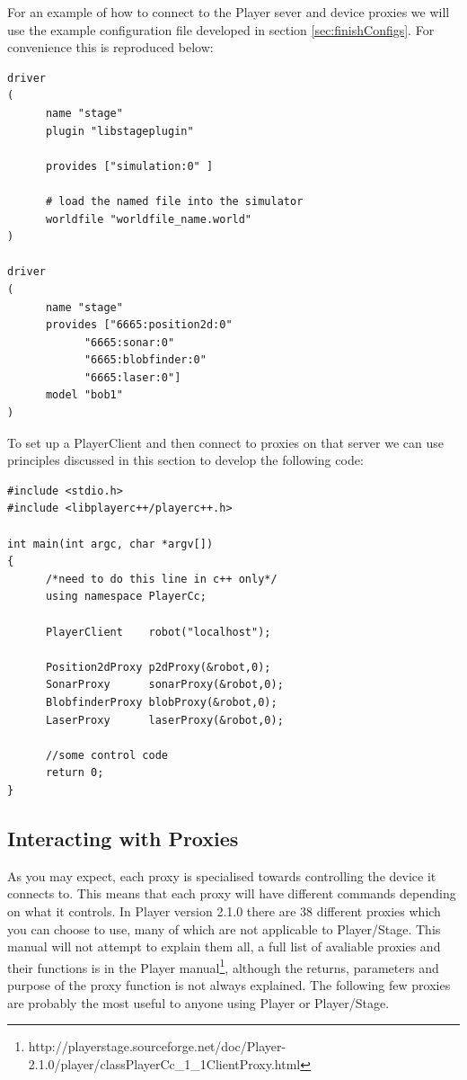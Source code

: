 \documentclass[a4paper]{report}
\newcommand{\plst}{Player/Stage\xspace}
\newcommand{\pl}{Player\xspace}
\begin{document}
For an example of how to connect to the \pl sever and device proxies we will use the example configuration file developed in section \ref{sec:finishConfigs}. For convenience this is reproduced below:
\begin{verbatim}
driver
(		
      name "stage"
      plugin "libstageplugin"

      provides ["simulation:0" ]

      # load the named file into the simulator
      worldfile "worldfile_name.world"	
)      

driver
(
      name "stage"
      provides ["6665:position2d:0" 
            "6665:sonar:0" 
            "6665:blobfinder:0" 
            "6665:laser:0"]
      model "bob1" 
)
\end{verbatim}
To set up a PlayerClient and then connect to proxies on that server we can use principles discussed in this section to develop the following code:
\begin{verbatim}
#include <stdio.h>
#include <libplayerc++/playerc++.h>

int main(int argc, char *argv[])
{
      /*need to do this line in c++ only*/
      using namespace PlayerCc;
	
      PlayerClient    robot("localhost");

      Position2dProxy p2dProxy(&robot,0);
      SonarProxy      sonarProxy(&robot,0);
      BlobfinderProxy blobProxy(&robot,0);
      LaserProxy      laserProxy(&robot,0);

      //some control code
      return 0;
}
\end{verbatim}

\subsection{Interacting with Proxies}\label{sec:interactingwithproxies}

As you may expect, each proxy is specialised towards controlling the device it connects to. This means that each proxy will have different commands depending on what it controls. 
In Player version 2.1.0 there are 38 different proxies which you can choose to use, many of which are not applicable to \plst. This manual will not attempt to explain them all, a full list of avaliable proxies and their functions is in the \pl manual\footnote{http://playerstage.sourceforge.net/doc/Player-2.1.0/player/classPlayerCc\_1\_1ClientProxy.html}, although the returns, parameters and purpose of the proxy function is not always explained. 
\newline The following few proxies are probably the most useful to anyone using \pl or \plst.
\end{document}
